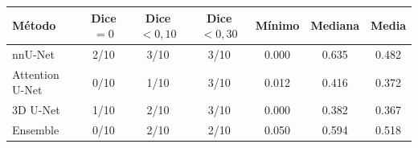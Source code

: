 \small
\begin{tabular}{lcccccc}
\toprule
Método & Dice $=0$ & Dice $<0{,}10$ & Dice $<0{,}30$ & Mínimo & Mediana & Media \\
\midrule
nnU-Net & 2/10 & 3/10 & 3/10 & 0.000 & 0.635 & 0.482 \\
Attention U-Net & 0/10 & 1/10 & 3/10 & 0.012 & 0.416 & 0.372 \\
3D U-Net & 1/10 & 2/10 & 3/10 & 0.000 & 0.382 & 0.367 \\
Ensemble & 0/10 & 2/10 & 2/10 & 0.050 & 0.594 & 0.518 \\
\bottomrule
\end{tabular}%
